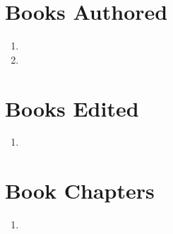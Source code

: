 \section*{Books Authored}

\begin{enumerate}
    \item {}
    \item {}
\end{enumerate}

\section*{Books Edited}

\begin{enumerate}
    \item {}
\end{enumerate}

\section*{Book Chapters}

\begin{enumerate}
    \item {}
\end{enumerate}

